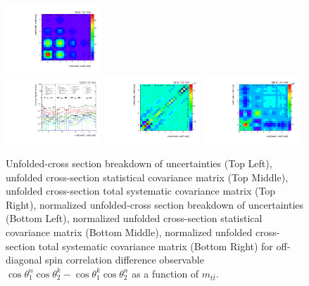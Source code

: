 \begin{refsection}
\begin{figure}[htb]
\begin{center}
 \includegraphics[width=0.32\textwidth]{fig_fullRun2UL/unfolding/combined/TotalSystCovMatrix_rebinnedB_c_Mnk_mttbar.pdf} \\
 \includegraphics[width=0.32\textwidth]{fig_fullRun2UL/unfolding/combined/deltaSystCombinedlogNorm_rebinnedB_c_Mnk_mttbar.pdf}
 \includegraphics[width=0.32\textwidth]{fig_fullRun2UL/unfolding/combined/StatCovMatrixNorm_rebinnedB_c_Mnk_mttbar.pdf}
 \includegraphics[width=0.32\textwidth]{fig_fullRun2UL/unfolding/combined/TotalSystCovMatrixNorm_rebinnedB_c_Mnk_mttbar.pdf} \\
\caption{Unfolded-cross section breakdown of uncertainties (Top Left), unfolded cross-section statistical covariance matrix (Top Middle), unfolded cross-section total systematic covariance matrix (Top Right), normalized unfolded-cross section breakdown of uncertainties (Bottom Left), normalized unfolded cross-section statistical covariance matrix (Bottom Middle), normalized unfolded cross-section total systematic covariance matrix (Bottom Right) for off-diagonal spin correlation difference observable $\cos\theta_{1}^{n}\cos\theta_{2}^{k}-\cos\theta_{1}^{k}\cos\theta_{2}^{n}$ as a function of $m_{t\bar{t}}$.}
\label{fig:c_Mnk_mttbar_uncertainties}
\end{center}

\end{figure}
\end{refsection}
